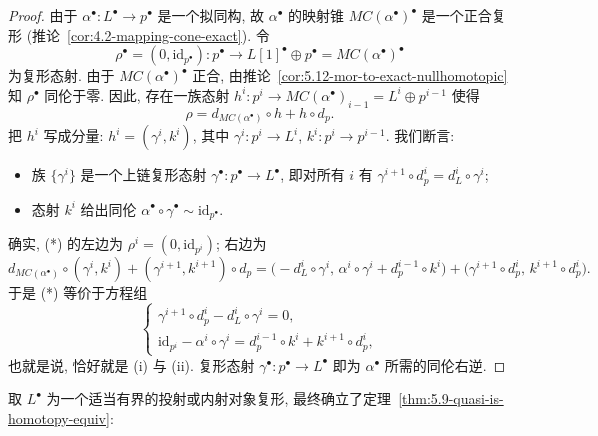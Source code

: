 \begin{proof}
由于 $\alpha^\bullet:L^\bullet\to p^\bullet$ 是一个拟同构, 故 $\alpha^\bullet$ 的映射锥 $MC(\alpha^\bullet)^\bullet$ 是一个正合复形 (推论~\ref{cor:4.2-mapping-cone-exact}). 令
\[
\rho^\bullet=(0,\mathrm{id}_{p^\bullet}):p^\bullet\longrightarrow L[1]^\bullet\oplus p^\bullet=MC(\alpha^\bullet)^\bullet
\]
为复形态射. 由于 $MC(\alpha^\bullet)^\bullet$ 正合, 由推论~\ref{cor:5.12-mor-to-exact-nullhomotopic} 知 $\rho^\bullet$ 同伦于零. 因此, 存在一族态射 $h^{i}:p^{i}\to MC(\alpha^\bullet)_{i-1}=L^{i}\oplus p^{i-1}$ 使得
\[
\rho=d_{MC(\alpha^\bullet)}\circ h+h\circ d_p.
\]
把 $h^{i}$ 写成分量: $h^{i}=(\gamma^{i},k^{i})$, 其中 $\gamma^{i}:p^{i}\to L^{i}$, $k^{i}:p^{i}\to p^{i-1}$. 我们断言:
\begin{itemize}
\item[(i)] 族 $\{\gamma^{i}\}$ 是一个上链复形态射 $\gamma^\bullet:p^\bullet\to L^\bullet$, 即对所有 $i$ 有 $\gamma^{i+1}\circ d_p^{i}=d_L^{i}\circ\gamma^{i}$;
\item[(ii)] 态射 $k^{i}$ 给出同伦 $\alpha^\bullet\circ\gamma^\bullet\sim\mathrm{id}_{p^\bullet}$.
\end{itemize}
确实, (*) 的左边为 $\rho^{i}=(0,\mathrm{id}_{p^{i}})$; 右边为
\[
d_{MC(\alpha^\bullet)}\circ(\gamma^{i},k^{i})+(\gamma^{i+1},k^{i+1})\circ d_p
=\bigl(-d_L^{i}\circ\gamma^{i},\,\alpha^{i}\circ\gamma^{i}+d_p^{i-1}\circ k^{i}\bigr)+\bigl(\gamma^{i+1}\circ d_p^{i},\,k^{i+1}\circ d_p^{i}\bigr).
\]
于是 (*) 等价于方程组
\[
\begin{cases}
\gamma^{i+1}\circ d_p^{i}-d_L^{i}\circ\gamma^{i}=0,\\
\mathrm{id}_{p^{i}}-\alpha^{i}\circ\gamma^{i}=d_p^{i-1}\circ k^{i}+k^{i+1}\circ d_p^{i},
\end{cases}
\]
也就是说, 恰好就是 (i) 与 (ii). 复形态射 $\gamma^\bullet:p^\bullet\to L^\bullet$ 即为 $\alpha^\bullet$ 所需的同伦右逆.
\end{proof}

\indent 取 $L^\bullet$ 为一个适当有界的投射或内射对象复形, 最终确立了定理~\ref{thm:5.9-quasi-is-homotopy-equiv}:

